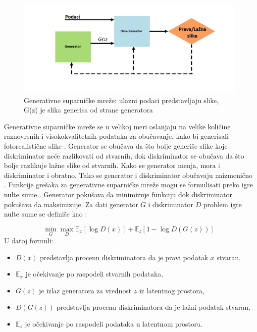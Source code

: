 \documentclass[12pt,oneside]{memoir}
\begin{document}
\begin{figure}[ht]
    \centering
    \includegraphics[width=1\textwidth]{matfmaster/glava2/gans_cus.png}
    \caption{Generativne suparničke mreže: ulazni podaci predstavljaju slike, G(z) je  slika generisa od strane generatora \cite{gans_image}}
    \label{fig:section2_gans}
\end{figure}

Generativne suparničke mreže se u velikoj meri oslanjaju na velike količine raznovrsnih i visokokvalitetnih podataka za obučavanje, kako bi generisali fotorealistične slike \cite{zhao2020differentiable}. 
Generator se obučava da što bolje generiše slike koje diskriminator neće razlikovati od stvarnih, dok diskriminator se obučava da što bolje razlikuje lažne slike od stvarnih. Kako se generator menja, mora i diskriminator i obratno. Tako se generator i diskriminator obučavaju naizmenično \cite{ml2019}. 
Funkcije grešaka za generativne suparničke mreže mogu se formulisati preko igre nulte sume \cite{goodfellow2020generative, hodgson2006microeconomics}. Generator pokušava da minimizuje funkciju dok diskriminator pokušava da maksimizuje. Za dati generator $G$ i diskriminator $D$ problem igre nulte sume se definiše kao \cite{goodfellow2020generative, ml2019}:

\begin{equation}
   \min_{G}\max_{D}\mathbb{E}_{x}[\log{D(x)}] +  \mathbb{E}_{z}[1 - \log{D(G(z))}]
\end{equation}
U datoj formuli:
\begin{itemize}
    \item $D(x)$ predstavlja procenu diskriminatora da je pravi podatak $x$ stvaran,
    \item $\mathbb{E}_{x}$ je očekivanje po raspodeli stvarnih podataka,
    \item $G(z)$ je izlaz generatora za vrednost $z$ iz latentnog prostora,
    \item $D(G(z))$ predstavlja procenu diskriminatora da je lažni podatak stvaran,
    \item $\mathbb{E}_{z}$ je očekivanje po raspodeli podataka u latentnom prostoru.
\end{itemize}
\end{document}

